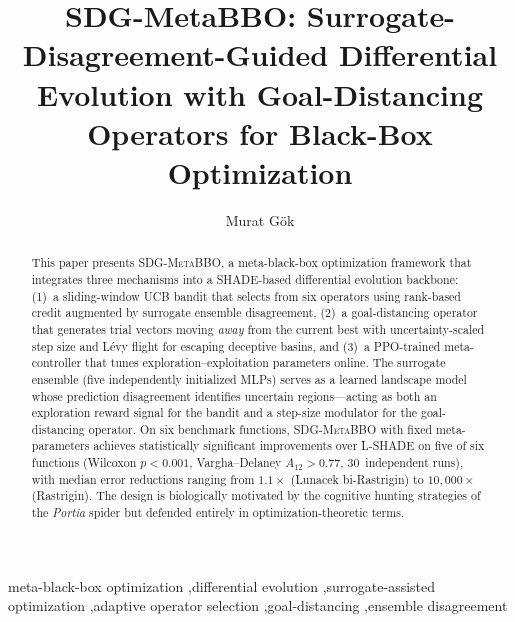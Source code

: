 \documentclass[preprint,12pt,number]{elsarticle}
\newcommand{\sdg}{\textsc{SDG-MetaBBO}}
\begin{document}
\linenumbers  %

\begin{frontmatter}

\title{SDG-MetaBBO: Surrogate-Disagreement-Guided Differential Evolution with Goal-Distancing Operators for Black-Box Optimization}

\author[yalova]{Murat G\"ok}


\begin{abstract}
This paper presents \sdg{}, a meta-black-box optimization framework that integrates three mechanisms into a SHADE-based differential evolution backbone: (1)~a sliding-window UCB bandit that selects from six operators using rank-based credit augmented by surrogate ensemble disagreement, (2)~a goal-distancing operator that generates trial vectors moving \emph{away} from the current best with uncertainty-scaled step size and L\'evy flight for escaping deceptive basins, and (3)~a PPO-trained meta-controller that tunes exploration--exploitation parameters online. The surrogate ensemble (five independently initialized MLPs) serves as a learned landscape model whose prediction disagreement identifies uncertain regions---acting as both an exploration reward signal for the bandit and a step-size modulator for the goal-distancing operator. On six benchmark functions, \sdg{} with fixed meta-parameters achieves statistically significant improvements over L-SHADE on five of six functions (Wilcoxon $p < 0.001$, Vargha--Delaney $A_{12} > 0.77$, 30~independent runs), with median error reductions ranging from $1.1\times$ (Lunacek bi-Rastrigin) to $10{,}000\times$ (Rastrigin). The design is biologically motivated by the cognitive hunting strategies of the \emph{Portia} spider but defended entirely in optimization-theoretic terms.
\end{abstract}

\begin{keyword}
meta-black-box optimization \sep differential evolution \sep surrogate-assisted optimization \sep adaptive operator selection \sep goal-distancing \sep ensemble disagreement
\end{keyword}

\end{frontmatter}
\end{document}
